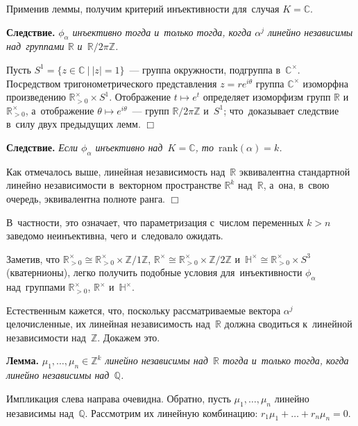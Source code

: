 \documentclass[twoside]{article}
\begin{document}
Применив леммы, получим критерий инъективности для~случая $K = \mathbb{C}$.

\medskip\noindent\textbf{Следствие.}\emph{
    $\phi_\alpha$ инъективно тогда и~только тогда, когда $\alpha^j$ линейно независимы над~группами $\mathbb{R}$ и~$\mathbb{R} / 2 \pi \mathbb{Z}$.
}\medskip

    Пусть $S^1 = \{ z \in \mathbb{C}\ | \ |z| = 1 \}$~— группа окружности, подгруппа в~${\mathbb{C}^\times}$.
    Посредством тригонометрического представления $z = re^{i \theta}$ группа ${\mathbb{C}^\times}$
    изоморфна произведению $\mathbb{R}_{> 0}^\times \times S^1$. Отображение $t \mapsto e^t$ определяет
    изоморфизм групп $\mathbb{R}$ и~$\mathbb{R}_{> 0}^\times$, а~отображение $\theta \mapsto e^{i\theta}$~— групп $\mathbb{R} / 2 \pi \mathbb{Z}$ и~$S^1$;
    что~доказывает следствие в~силу двух предыдущих лемм.
\hfill$\Box$\medskip

\medskip\noindent\textbf{Следствие.}\emph{
    Если $\phi_\alpha$ инъективно над~$K = \mathbb{C}$, то~$\mathrm{rank}(\alpha) = k$.
}\medskip

    Как отмечалось выше, линейная независимость над~$\mathbb{R}$ эквивалентна стандартной линейно независимости
    в~векторном пространстве $\mathbb{R}^k$ над~$\mathbb{R}$, а~она, в~свою очередь, эквивалентна полноте ранга.
\hfill$\Box$\medskip

В~частности, это означает, что параметризация с~числом переменных $k > n$ заведомо неинъективна, чего и~следовало ожидать.

Заметив, что $\mathbb{R}_{>0}^\times \cong \mathbb{R}_{>0}^\times \times \mathbb{Z} / 1\mathbb{Z}$, $\mathbb{R}^\times \cong \mathbb{R}_{>0}^\times \times \mathbb{Z} / 2 \mathbb{Z}$
и~$\mathbb{H}^\times \cong \mathbb{R}_{>0}^\times \times S^3$ (кватернионы), легко получить подобные условия для~инъективности
$\phi_\alpha$ над~группами $\mathbb{R}_{>0}^\times$, $\mathbb{R}^\times$ и~$\mathbb{H}^\times$.

Естественным кажется, что, поскольку рассматриваемые вектора $\alpha^j$ целочисленные, их линейная независимость
над~$\mathbb{R}$ должна сводиться к~линейной независимости над~$\mathbb{Z}$. Докажем это.

\medskip\noindent\textbf{Лемма.}\emph{
    $\mu_1, \ldots, \mu_n \in \mathbb{Z}^k$ линейно независимы над~$\mathbb{R}$ тогда и~только тогда, когда линейно независимы над~$\mathbb{Q}$.
}\medskip

    Импликация слева направа очевидна. Обратно, пусть $\mu_1, \ldots, \mu_n$ линейно независимы над~$\mathbb{Q}$.
    Рассмотрим их линейную комбинацию: $r_1 \mu_1 + \ldots + r_n \mu_n = 0$.
\end{document}
